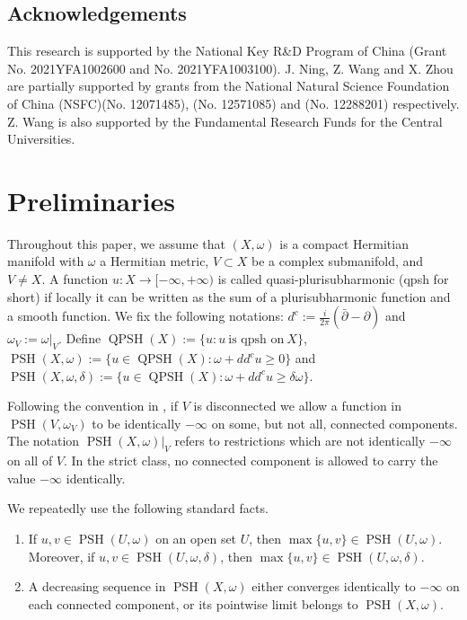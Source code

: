 \documentclass[12pt,reqno]{amsart}
\newcommand{\PSH}{\operatorname{PSH}}
\newcommand{\QPSH}{\operatorname{QPSH}}
\newcommand{\ddc}{dd^c}
\begin{document}
	\subsection*{Acknowledgements}
	This research is supported by the National Key R\&D Program of China (Grant No. 2021YFA1002600 and  No. 2021YFA1003100).  J. Ning, Z. Wang and X. Zhou are partially supported by grants from the National Natural Science Foundation of China
(NSFC)(No. 12071485), (No. 12571085) and (No. 12288201) respectively. Z. Wang is also supported by the Fundamental Research Funds for the Central Universities.
	
	\section{Preliminaries}
Throughout this paper, we assume that
	$(X,\omega)$ is a compact Hermitian manifold with $\omega$ a Hermitian metric, $V\subset X$ be a complex submanifold, and $V\neq X$.
A function $u\colon X\to[-\infty,+\infty)$ is called quasi-plurisubharmonic (qpsh for short) if locally it can be written as the sum of a plurisubharmonic function and a smooth function. We fix the following notations: $d^c:=\frac{i}{2\pi}(\bar\partial-\partial)$ and $\omega_V:=\omega|_V$.
Define $\QPSH(X):=\{u: u\ \text{is qpsh on}\  X\}$, $\PSH(X,\omega) :=\{u\in\QPSH(X):\omega+\ddc u\geq0\}$ and $\PSH(X,\omega,\delta) :=\{u\in\QPSH(X):\omega+\ddc u\geq\delta\omega\}$.
	
	Following the convention in \cite{CGZ22}, if $V$ is disconnected we allow a function in $\PSH(V,\omega_V)$ to be identically $-\infty$ on some, but not all, connected components. The notation $\PSH(X,\omega)|_V$ refers to restrictions which are not identically $-\infty$ on all of $V$. In the strict class, no connected component is allowed to carry the value $-\infty$ identically.
	
	We repeatedly use the following standard facts.
	
	\begin{enumerate}[label=(\roman*)]
		\item If $u,v\in\PSH(U,\omega)$ on an open set $U$, then $\max\{u,v\}\in\PSH(U,\omega)$.
		Moreover, if $u,v\in \PSH(U,\omega,\delta)$, then $\max\{u,v\}\in \PSH(U,\omega,\delta)$.
		\item A decreasing sequence in $\PSH(X,\omega)$ either converges identically to $-\infty$ on each connected component, or its pointwise limit belongs to $\PSH(X,\omega)$.
	\end{enumerate}
	
\end{document}
